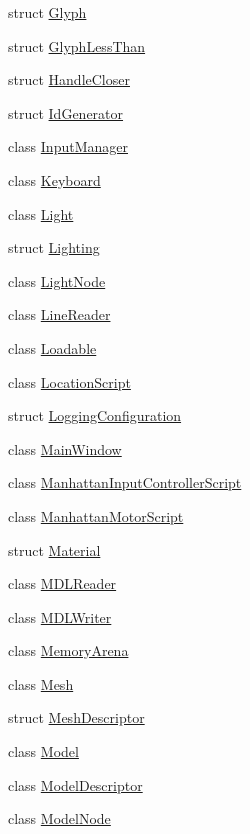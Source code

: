 \begin{DoxyCompactItemize}
struct \hyperlink{structmage_1_1_glyph}{Glyph}
\item 
struct \hyperlink{structmage_1_1_glyph_less_than}{Glyph\+Less\+Than}
\item 
struct \hyperlink{structmage_1_1_handle_closer}{Handle\+Closer}
\item 
struct \hyperlink{structmage_1_1_id_generator}{Id\+Generator}
\item 
class \hyperlink{classmage_1_1_input_manager}{Input\+Manager}
\item 
class \hyperlink{classmage_1_1_keyboard}{Keyboard}
\item 
class \hyperlink{classmage_1_1_light}{Light}
\item 
struct \hyperlink{structmage_1_1_lighting}{Lighting}
\item 
class \hyperlink{classmage_1_1_light_node}{Light\+Node}
\item 
class \hyperlink{classmage_1_1_line_reader}{Line\+Reader}
\item 
class \hyperlink{classmage_1_1_loadable}{Loadable}
\item 
class \hyperlink{classmage_1_1_location_script}{Location\+Script}
\item 
struct \hyperlink{structmage_1_1_logging_configuration}{Logging\+Configuration}
\item 
class \hyperlink{classmage_1_1_main_window}{Main\+Window}
\item 
class \hyperlink{classmage_1_1_manhattan_input_controller_script}{Manhattan\+Input\+Controller\+Script}
\item 
class \hyperlink{classmage_1_1_manhattan_motor_script}{Manhattan\+Motor\+Script}
\item 
struct \hyperlink{structmage_1_1_material}{Material}
\item 
class \hyperlink{classmage_1_1_m_d_l_reader}{M\+D\+L\+Reader}
\item 
class \hyperlink{classmage_1_1_m_d_l_writer}{M\+D\+L\+Writer}
\item 
class \hyperlink{classmage_1_1_memory_arena}{Memory\+Arena}
\item 
class \hyperlink{classmage_1_1_mesh}{Mesh}
\item 
struct \hyperlink{structmage_1_1_mesh_descriptor}{Mesh\+Descriptor}
\item 
class \hyperlink{classmage_1_1_model}{Model}
\item 
class \hyperlink{classmage_1_1_model_descriptor}{Model\+Descriptor}
\item 
class \hyperlink{classmage_1_1_model_node}{Model\+Node}

\end{DoxyCompactItemize}
